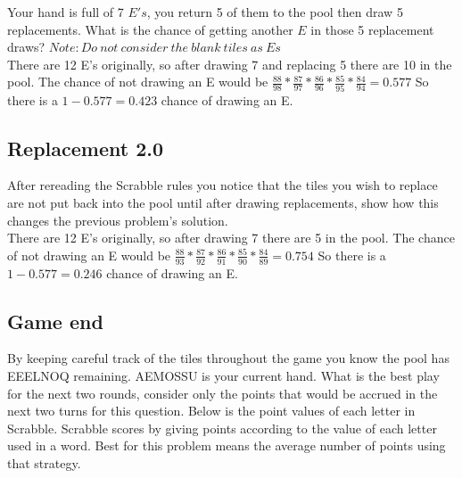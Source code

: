 \documentclass{article}
\begin{document}
Your hand is full of 7 $E's$, you return 5 of them to the pool then draw 5 replacements. What is the chance of getting another $E$ in those 5 replacement draws?  $Note: Do\ not\ consider\ the\ blank\ tiles\ as\ Es$
\\


There are 12 E's originally, so after drawing 7 and replacing 5 there are 10 in the pool.  The chance of not drawing an E would be $\frac{88}{98} * \frac{87}{97} * \frac{86}{96} * \frac{85}{95} * \frac{84}{94}=0.577$ So there is a $1-0.577=0.423$ chance of drawing an E.

\subsection{Replacement 2.0}

After rereading the Scrabble rules you notice that the tiles you wish to replace are not put back into the pool until after drawing replacements, show how this changes the previous problem's solution.
\\

There are 12 E's originally, so after drawing 7 there are 5 in the pool.  The chance of not drawing an E would be $\frac{88}{93} * \frac{87}{92} * \frac{86}{91} * \frac{85}{90} * \frac{84}{89}=0.754$ So there is a $1-0.577=0.246$ chance of drawing an E.

\subsection{Game end}

By keeping careful track of the tiles throughout the game you know the pool has EEELNOQ remaining.  AEMOSSU is your current hand.  What is the best play for the next two rounds, consider only the points that would be accrued in the next two turns for this question.  Below is the point values of each letter in Scrabble.  Scrabble scores by giving points according to the value of each letter used in a word. Best for this problem means the average number of points using that strategy. 
\end{document}
